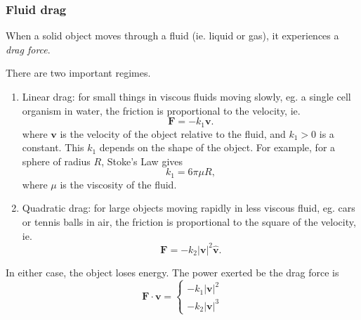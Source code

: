 \documentclass[a4paper]{article}
\begin{document}
\subsubsection*{Fluid drag}
When a solid object moves through a fluid (ie. liquid or gas), it experiences a \emph{drag force}.

There are two important regimes.

\begin{enumerate}
  \item Linear drag: for small things in viscous fluids moving slowly, eg. a single cell organism in water, the friction is proportional to the velocity, ie.
    \[
      \mathbf{F} = -k_1 \mathbf{v}.
    \]
    where $\mathbf{v}$ is the velocity of the object relative to the fluid, and $k_1 > 0$ is a constant. This $k_1$ depends on the shape of the object. For example, for a sphere of radius $R$, Stoke's Law gives
    \[
      k_1 = 6\pi \mu R,
    \]
    where $\mu$ is the viscosity of the fluid.
  \item Quadratic drag: for large objects moving rapidly in less viscous fluid, eg. cars or tennis balls in air, the friction is proportional to the square of the velocity, ie.
    \[
      \mathbf{F} = -k_2|\mathbf{v}|^2\hat{\mathbf{v}}.
    \]
\end{enumerate}
In either case, the object loses energy. The power exerted be the drag force is
\[
  \mathbf{F}\cdot \mathbf{v} = \begin{cases} -k_1|\mathbf{v}|^2\\-k_2 |\mathbf{v}|^3 \end{cases}
\]
\end{document}
